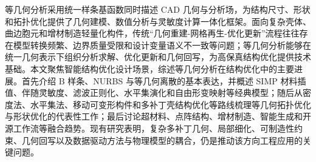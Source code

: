 等几何分析采用统一样条基函数同时描述 CAD 几何与分析场，为结构尺寸、形状和拓扑优化提供了几何建模、数值分析与灵敏度计算一体化框架。面向复杂壳体、曲边胞元和增材制造轻量化构件，传统“几何重建-网格再生-优化更新”流程往往存在模型转换频繁、边界质量受限和设计变量语义不一致等问题；等几何分析能够在统一几何表示下组织分析求解、优化更新和几何回写，为高保真结构优化提供技术基础。本文聚焦智能结构优化设计场景，综述等几何分析在结构优化中的主要进展。首先介绍 B 样条、NURBS 与等几何离散的基本表达，并概述 SIMP 材料插值、伴随灵敏度、滤波正则化、水平集演化和自由形变映射等经典模型；随后从密度法、水平集法、移动可变形构件和多补丁壳结构优化等路线梳理等几何拓扑优化与形状优化的代表性工作；最后讨论超材料、点阵结构、增材制造、智能生成和开源工作流等融合趋势。现有研究表明，复杂多补丁几何、局部细化、可制造性约束、几何回写以及数据驱动方法与物理模型的耦合，仍是推动该方向工程应用的关键问题。
